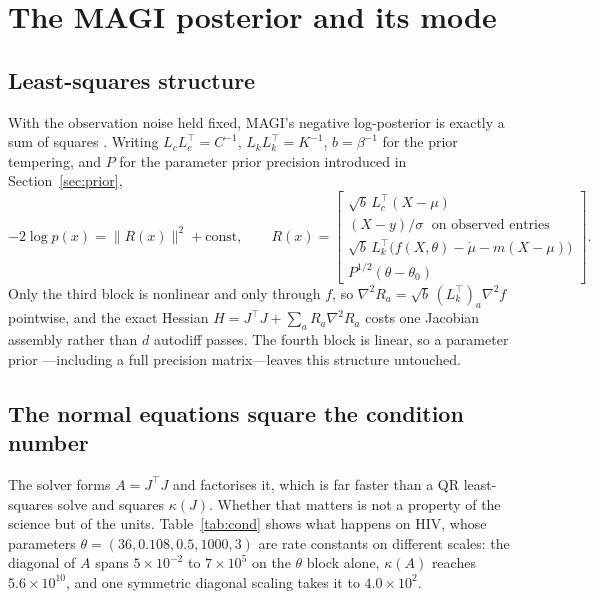 \documentclass[11pt]{article}
\theoremstyle{plain}
\theoremstyle{definition}
\theoremstyle{remark}
\begin{document}
\section{The MAGI posterior and its mode}
\label{sec:solver}

\subsection{Least-squares structure}

With the observation noise held fixed, MAGI's negative log-posterior is exactly a sum of squares
\cite{companion}. Writing $L_cL_c^\top = C^{-1}$, $L_kL_k^\top = K^{-1}$, $b = \beta^{-1}$ for the
prior tempering, and $P$ for the parameter prior precision introduced in Section~\ref{sec:prior},
\begin{equation}
\label{eq:residual}
  -2\log p(x) = \|R(x)\|^2 + \text{const},\qquad
  R(x) = \begin{bmatrix}
    \sqrt{b}\, L_c^\top (X-\mu)\\
    (X-y)/\sigma \;\text{ on observed entries}\\
    \sqrt{b}\, L_k^\top\big(f(X,\theta)-\dot\mu-m(X-\mu)\big)\\
    P^{1/2}(\theta - \theta_0)
  \end{bmatrix}.
\end{equation}
Only the third block is nonlinear and only through $f$, so $\nabla^2 R_a = \sqrt b\,(L_k^\top)_a
\nabla^2 f$ pointwise, and the exact Hessian $H = J^\top J + \sum_a R_a \nabla^2 R_a$ costs one
Jacobian assembly rather than $d$ autodiff passes. The fourth block is linear, so a parameter prior
---including a full precision matrix---leaves this structure untouched.

\subsection{The normal equations square the condition number}

The solver forms $A = J^\top J$ and factorises it, which is far faster than a QR least-squares
solve and squares $\kappa(J)$. Whether that matters is not a property of the science but of the
units. Table~\ref{tab:cond} shows what happens on HIV, whose parameters
$\theta = (36, 0.108, 0.5, 1000, 3)$ are rate constants on different scales: the diagonal of $A$
spans $5\times10^{-2}$ to $7\times10^{5}$ on the $\theta$ block alone, $\kappa(A)$ reaches
$5.6\times10^{10}$, and one symmetric diagonal scaling takes it to $4.0\times10^{2}$.
\end{document}
